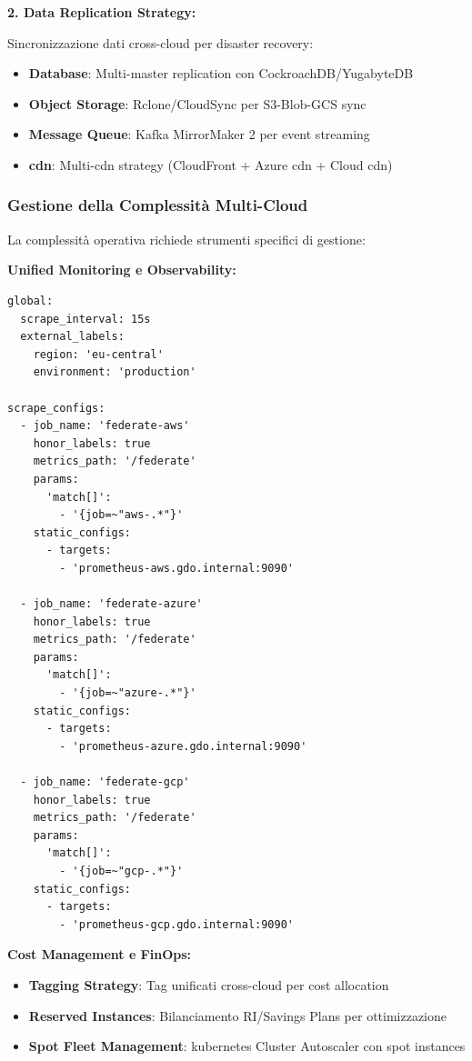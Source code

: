 \textbf{2. Data Replication Strategy:}

Sincronizzazione dati cross-cloud per disaster recovery:

\begin{itemize}
    \item \textbf{Database}: Multi-master replication con CockroachDB/YugabyteDB
    \item \textbf{Object Storage}: Rclone/CloudSync per S3-Blob-GCS sync
    \item \textbf{Message Queue}: Kafka MirrorMaker 2 per event streaming
    \item \textbf{\gls{cdn}}: Multi-\gls{cdn} strategy (CloudFront + Azure \gls{cdn} + Cloud \gls{cdn})
\end{itemize}

\subsubsection{\texorpdfstring{Gestione della Complessità Multi-Cloud}{3.4.2.3 - Gestione della Complessità Multi-Cloud}}

La complessità operativa richiede strumenti specifici di gestione:

\textbf{Unified Monitoring e Observability:}
\begin{lstlisting}[caption={Prometheus Federation per Multi-Cloud},label={lst:prometheus_federation}]
global:
  scrape_interval: 15s
  external_labels:
    region: 'eu-central'
    environment: 'production'

scrape_configs:
  - job_name: 'federate-aws'
    honor_labels: true
    metrics_path: '/federate'
    params:
      'match[]':
        - '{job=~"aws-.*"}'
    static_configs:
      - targets:
        - 'prometheus-aws.gdo.internal:9090'
        
  - job_name: 'federate-azure'
    honor_labels: true
    metrics_path: '/federate'
    params:
      'match[]':
        - '{job=~"azure-.*"}'
    static_configs:
      - targets:
        - 'prometheus-azure.gdo.internal:9090'
        
  - job_name: 'federate-gcp'
    honor_labels: true
    metrics_path: '/federate'
    params:
      'match[]':
        - '{job=~"gcp-.*"}'
    static_configs:
      - targets:
        - 'prometheus-gcp.gdo.internal:9090'
\end{lstlisting}

\textbf{Cost Management e FinOps:}
\begin{itemize}
    \item \textbf{Tagging Strategy}: Tag unificati cross-cloud per cost allocation
    \item \textbf{Reserved Instances}: Bilanciamento RI/Savings Plans per ottimizzazione
    \item \textbf{Spot Fleet Management}: \gls{kubernetes} Cluster Autoscaler con spot instances
\end{itemize}

